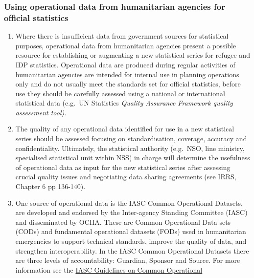 \documentclass[
]{article}
\begin{document}
\hypertarget{using-operational-data-from-humanitarian-agencies-for-official-statistics}{%
\subsubsection{Using operational data from humanitarian agencies for official statistics}\label{using-operational-data-from-humanitarian-agencies-for-official-statistics}}

\begin{enumerate}
\def\labelenumi{\arabic{enumi}.}
\setcounter{enumi}{41}
\item
  Where there is insufficient data from government sources for
  statistical purposes, operational data from humanitarian agencies
  present a possible resource for establishing or augmenting a new
  statistical series for refugee and IDP statistics. Operational data
  are produced during regular activities of humanitarian agencies are
  intended for internal use in planning operations only and do not
  usually meet the standards set for official statistics, before use
  they should be carefully assessed using a national or international
  statistical data (e.g.~UN Statistics \emph{Quality Assurance Framework
  quality assessment tool).}
\item
  The quality of any operational data identified for use in a new
  statistical series should be assessed focusing on standardisation,
  coverage, accuracy and confidentiality. Ultimately, the statistical
  authority (e.g.~NSO, line ministry, specialised statistical unit
  within NSS) in charge will determine the usefulness of operational
  data as input for the new statistical series after assessing crucial
  quality issues and negotiating data sharing agreements (see IRRS,
  Chapter 6 pp 136-140).
\item
  One source of operational data is the IASC Common Operational
  Datasets, are developed and endorsed by the Inter-agency Standing
  Committee (IASC) and disseminated by OCHA. These are Common
  Operational Data sets (CODs) and fundamental operational datasets
  (FODs) used in humanitarian emergencies to support technical
  standards, improve the quality of data, and strengthen
  interoperability. In the IASC Common Operational Datasets there are
  three levels of accountability: Guardian, Sponsor and Source. For
  more information see the \href{https://fscluster.org/sites/default/files/documents/IASC_Guidelines_on_Common_Operational_Datasets_in_Disaster_Preparedness_and_Response_1_Nov._2010\%5B1\%5D.pdf}{IASC Guidelines on Common Operational
}
\end{enumerate}
\end{document}
